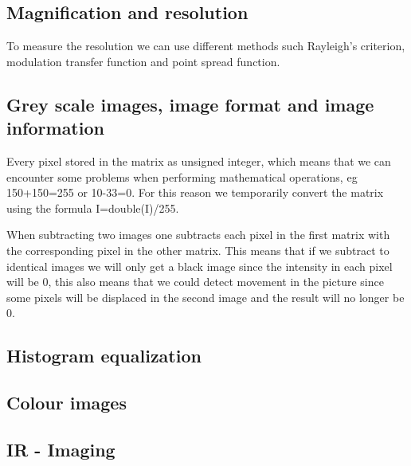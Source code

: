 \subsection{Magnification and resolution}
To measure the resolution we can use different methods such Rayleigh's criterion, modulation transfer function and point spread function. 

\subsection{Grey scale images, image format and image information}
Every pixel stored in the matrix as unsigned integer, which means that we can encounter some problems when performing mathematical operations, eg 150+150=255 or 10-33=0. For this reason we temporarily convert the matrix using the formula I=double(I)/255. 

When subtracting two images one subtracts each pixel in the first matrix with the corresponding pixel in the other matrix. %
This means that if we subtract to identical images we will only get a black image since the intensity in each pixel will be 0, this also means that we could detect movement in the picture since some pixels will be displaced in the second image and the result will no longer be 0.
\subsection{Histogram equalization}

\subsection{Colour images}


\subsection{IR - Imaging}